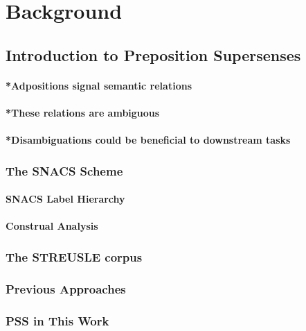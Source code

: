 
\chapter{Background} %

\label{Background} %


\section{Introduction to Preposition Supersenses}
\subsubsection{*Adpositions signal semantic relations}
\subsubsection{*These relations are ambiguous}
\subsubsection{*Disambiguations could be beneficial to downstream tasks}
\subsection{The SNACS Scheme}
\subsubsection{SNACS Label Hierarchy}
\subsubsection{Construal Analysis}
\subsection{The STREUSLE corpus}
\subsection{Previous Approaches}
\subsection{PSS in This Work}
\pagebreak

